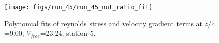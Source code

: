 \begin{figure}[H]
\centering
\texttt{[image: figs/run\_45/run\_45\_nut\_ratio\_fit]}
\caption{Polynomial fits of reynolds stress and velocity gradient terms at $z/c$=9.00, $V_{free}$=23.24, station 5.}
\label{fig:run_45_nut_ratio_fit}
\end{figure}


